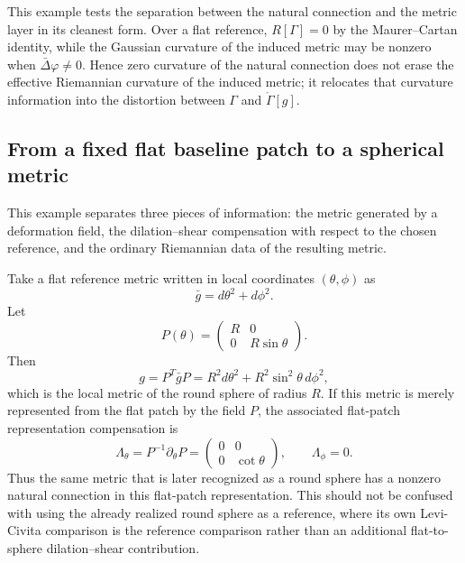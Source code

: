 \documentclass[12pt]{amsart}
\theoremstyle{definition}
\theoremstyle{remark}
\begin{document}
This example tests the separation between the natural connection and the metric layer in its cleanest form.  Over a flat reference, \(R[\Gamma]=0\) by the Maurer--Cartan identity, while the Gaussian curvature of the induced metric may be nonzero when \(\bar\Delta\varphi\neq0\).  Hence zero curvature of the natural connection does not erase the effective Riemannian curvature of the induced metric; it relocates that curvature information into the distortion between \(\Gamma\) and \(\mathring\Gamma[g]\).


\subsection{From a fixed flat baseline patch to a spherical metric}\label{subsec:flat_to_sphere_v2}

This example separates three pieces of information: the metric generated by a deformation field, the dilation--shear compensation with respect to the chosen reference, and the ordinary Riemannian data of the resulting metric.

Take a flat reference metric written in local coordinates \((\theta,\phi)\) as
\begin{equation}
 \bar g=d\theta^2+d\phi^2 .
\end{equation}
Let
\begin{equation}\label{eq:P_flat_to_sphere_v2}
 P(\theta)=
 \begin{pmatrix}
 R&0\\[2pt]
 0&R\sin\theta
 \end{pmatrix} .
\end{equation}
Then
\begin{equation}\label{eq:sphere_metric_from_flat_v2}
 g=P^T\bar gP=R^2d\theta^2+R^2\sin^2\theta\,d\phi^2,
\end{equation}
which is the local metric of the round sphere of radius \(R\).  If this metric is merely represented from the flat patch by the field \(P\), the associated flat-patch representation compensation is
\begin{equation}\label{eq:Lambda_flat_to_sphere_v2}
 \Lambda_\theta=P^{-1}\partial_\theta P=
 \begin{pmatrix}
 0&0\\[2pt]
 0&\cot\theta
 \end{pmatrix},
 \qquad
 \Lambda_\phi=0 .
\end{equation}
Thus the same metric that is later recognized as a round sphere has a nonzero natural connection in this flat-patch representation.  This should not be confused with using the already realized round sphere as a reference, where its own Levi-Civita comparison is the reference comparison rather than an additional flat-to-sphere dilation--shear contribution.
\end{document}
